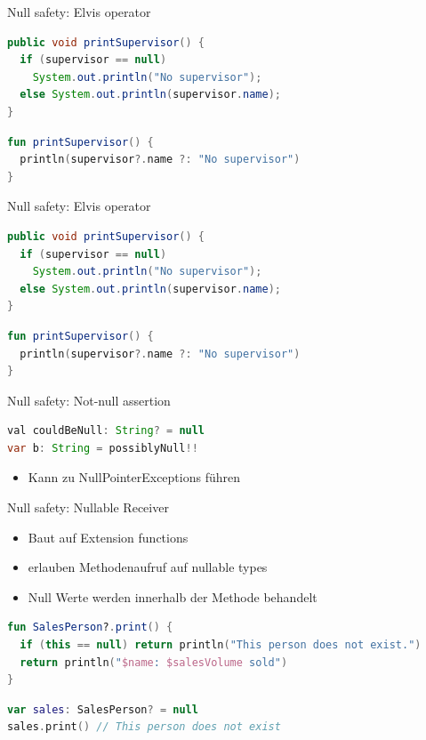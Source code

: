 \documentclass{beamer}
\begin{document}
\begin{frame}[fragile]{Null safety: Elvis operator}
  \begin{lstlisting}[language=Java]
public void printSupervisor() {
  if (supervisor == null)
    System.out.println("No supervisor");
  else System.out.println(supervisor.name);
}   
  \end{lstlisting}
  \begin{lstlisting}[language=Kotlin]
fun printSupervisor() {
  println(supervisor?.name ?: "No supervisor")
}
  \end{lstlisting}
\end{frame}

\begin{frame}[fragile]{Null safety: Elvis operator}
  \begin{lstlisting}[language=Java]
public void printSupervisor() {
  if (supervisor == null)
    System.out.println("No supervisor");
  else System.out.println(supervisor.name);
}   
  \end{lstlisting}
  \begin{lstlisting}[language=Kotlin]
fun printSupervisor() {
  println(supervisor?.name ?: "No supervisor")
}
  \end{lstlisting}
\end{frame}

\begin{frame}[fragile]{Null safety: Not-null assertion}
  \begin{lstlisting}[language=Java]
val couldBeNull: String? = null
var b: String = possiblyNull!!
  \end{lstlisting}
  \begin{itemize}
    \item Kann zu NullPointerExceptions führen
  \end{itemize}
\end{frame}

\begin{frame}[fragile]{Null safety: Nullable Receiver}
  \begin{itemize}
    \item Baut auf Extension functions
    \item erlauben Methodenaufruf auf nullable types
    \item Null Werte werden innerhalb der Methode behandelt
  \end{itemize}
  \begin{lstlisting}[language=Kotlin]
fun SalesPerson?.print() {
  if (this == null) return println("This person does not exist.")
  return println("$name: $salesVolume sold")
}
  \end{lstlisting}
  \begin{lstlisting}[language=Kotlin]
var sales: SalesPerson? = null
sales.print() // This person does not exist
  \end{lstlisting}
\end{frame}
\end{document}
